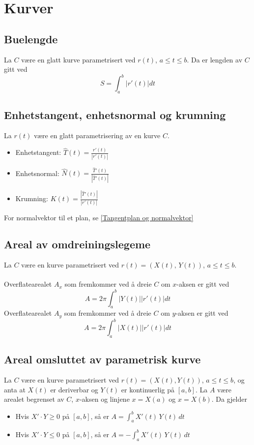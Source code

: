 \documentclass{article}
\begin{document}
\section{Kurver}


\subsection{Buelengde}
La  $C$ være en glatt kurve parametrisert ved $r(t)$, $a\leq t \leq b$. Da er lengden av $C$  gitt ved
\[S = \int_a^b \left| r'(t) \right| dt\]


\subsection{Enhetstangent, enhetsnormal og krumning}
La $r(t)$ være en glatt parametrisering av en kurve $C$.
\begin{itemize}
    \item Enhetstangent: $\hat{T}(t) = \frac{r'(t)}{\left| r'(t) \right|}$
    \item Enhetsnormal: $\hat{N}(t) = \frac{\hat{T}'(t)}{\left| \hat{T}'(t) \right|}$
    \item Krumning: $K(t) = \frac{\left| \hat{T}'(t) \right|}{\left| r'(t) \right|}$
\end{itemize}
For normalvektor til et plan, se \ref{Tangentplan og normalvektor}

\subsection{Areal av omdreiningslegeme}
La $C$ være en kurve parametrisert ved $r(t) = (X(t),\,Y(t))$, $a \leq t \leq b$. \\\\
Overflatearealet $A_x$ som fremkommer ved å dreie $C$ om $x$-aksen er gitt ved
\[A = 2\pi \int_a^b \left| Y(t) \right| \left| r'(t) \right| dt \]
Overflatearealet $A_y$ som fremkommer ved å dreie $C$ om $y$-aksen er gitt ved
\[A = 2\pi \int_a^b \left| X(t) \right| \left| r'(t) \right| dt \]

\subsection{Areal omsluttet av parametrisk kurve}
La $C$ være en kurve parametrisert ved $r(t) = (X(t), Y(t))$, $a \leq t \leq b$, og anta at $X(t)$ er deriverbar og $Y(t)$ er kontinuerlig på $\left[ a, b \right]$. La $A$ være arealet begrenset av $C$, $x$-aksen og linjene $x=X(a)$ og $x=X(b)$. Da gjelder
\begin{itemize}
    \item Hvis $X' \cdot Y \geq 0$ på $\left[ a, b \right]$, så er $A = \int_a^b X'(t)\,Y(t)\,dt$
    \item Hvis $X' \cdot Y \leq 0$ på $\left[ a, b \right]$, så er $A = -\int_a^b X'(t)\,Y(t)\,dt$
\end{itemize}
\end{document}
